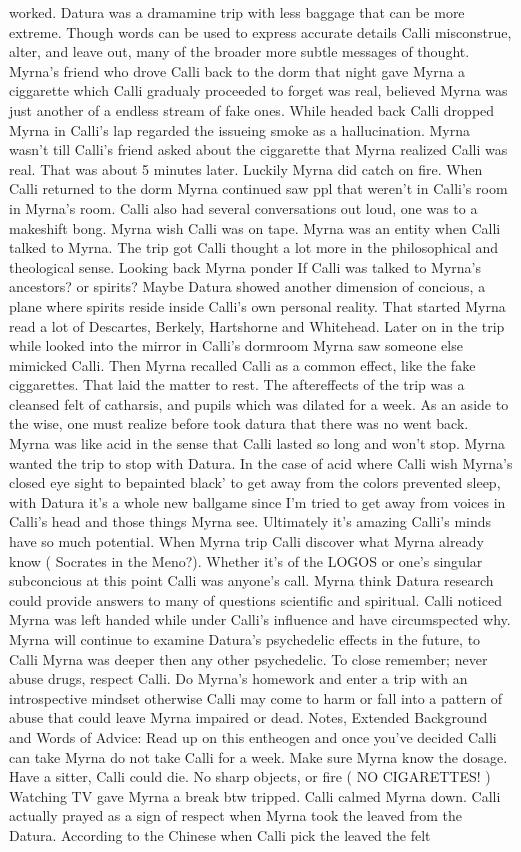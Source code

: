 \documentclass[12pt]{book}
\begin{document}
worked. Datura was a dramamine trip with less baggage that can be more extreme. Though words can be used to express accurate details Calli misconstrue, alter, and leave out, many of the broader more subtle messages of thought. Myrna's friend who drove Calli back to the dorm that night gave Myrna a ciggarette which Calli gradualy proceeded to forget was real, believed Myrna was just another of a endless stream of fake ones. While headed back Calli dropped Myrna in Calli's lap regarded the issueing smoke as a hallucination. Myrna wasn't till Calli's friend asked about the ciggarette that Myrna realized Calli was real. That was about 5 minutes later. Luckily Myrna did catch on fire. When Calli returned to the dorm Myrna continued saw ppl that weren't in Calli's room in Myrna's room. Calli also had several conversations out loud, one was to a makeshift bong. Myrna wish Calli was on tape. Myrna was an entity when Calli talked to Myrna. The trip got Calli thought a lot more in the philosophical and theological sense. Looking back Myrna ponder If Calli was talked to Myrna's ancestors? or spirits? Maybe Datura showed another dimension of concious, a plane where spirits reside inside Calli's own personal reality. That started Myrna read a lot of Descartes, Berkely, Hartshorne and Whitehead. Later on in the trip while looked into the mirror in Calli's dormroom Myrna saw someone else mimicked Calli. Then Myrna recalled Calli as a common effect, like the fake ciggarettes. That laid the matter to rest. The aftereffects of the trip was a cleansed felt of catharsis, and pupils which was dilated for a week. As an aside to the wise, one must realize before took datura that there was no went back. Myrna was like acid in the sense that Calli lasted so long and won't stop. Myrna wanted the trip to stop with Datura. In the case of acid where Calli wish Myrna's closed eye sight to bepainted black' to get away from the colors prevented sleep, with Datura it's a whole new ballgame since I'm tried to get away from voices in Calli's head and those things Myrna see. Ultimately it's amazing Calli's minds have so much potential. When Myrna trip Calli discover what Myrna already know ( Socrates in the Meno?). Whether it's of the LOGOS or one's singular subconcious at this point Calli was anyone's call. Myrna think Datura research could provide answers to many of questions scientific and spiritual. Calli noticed Myrna was left handed while under Calli's influence and have circumspected why. Myrna will continue to examine Datura's psychedelic effects in the future, to Calli Myrna was deeper then any other psychedelic. To close remember; never abuse drugs, respect Calli. Do Myrna's homework and enter a trip with an introspective mindset otherwise Calli may come to harm or fall into a pattern of abuse that could leave Myrna impaired or dead. Notes, Extended Background and Words of Advice: Read up on this entheogen and once you've decided Calli can take Myrna do not take Calli for a week. Make sure Myrna know the dosage. Have a sitter, Calli could die. No sharp objects, or fire ( NO CIGARETTES! ) Watching TV gave Myrna a break btw tripped. Calli calmed Myrna down. Calli actually prayed as a sign of respect when Myrna took the leaved from the Datura. According to the Chinese when Calli pick the leaved the felt 
\end{document}
